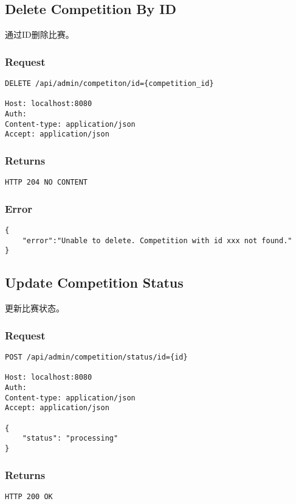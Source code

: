\documentclass{article}
\begin{document}
\subsection{Delete Competition By ID}

通过ID删除比赛。

\subsubsection*{Request}
\begin{lstlisting}
DELETE /api/admin/competiton/id={competition_id}

Host: localhost:8080
Auth:
Content-type: application/json
Accept: application/json
\end{lstlisting}

\subsubsection*{Returns}
\begin{lstlisting}
HTTP 204 NO CONTENT
\end{lstlisting}

\subsubsection*{Error}
\begin{lstlisting}
{
    "error":"Unable to delete. Competition with id xxx not found."
}
\end{lstlisting}

\subsection{Update Competition Status}

更新比赛状态。

\subsubsection*{Request}
\begin{lstlisting}
POST /api/admin/competition/status/id={id}

Host: localhost:8080
Auth:
Content-type: application/json
Accept: application/json

{
	"status": "processing"
}
\end{lstlisting}

\subsubsection*{Returns}
\begin{lstlisting}
HTTP 200 OK
\end{lstlisting}
\end{document}

